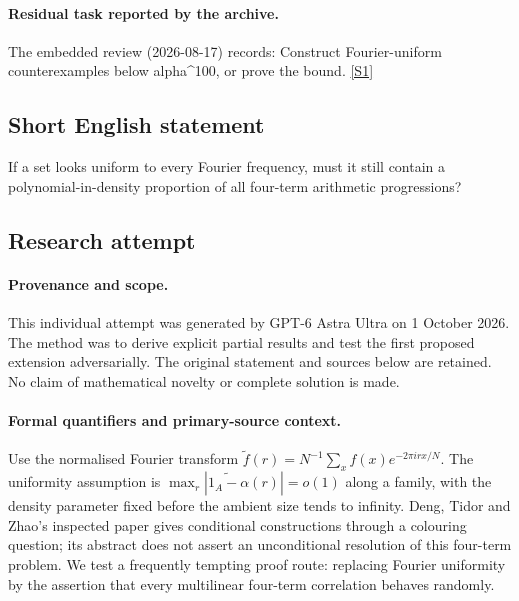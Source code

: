 \documentclass[11pt,a4paper]{article}
\newcommand{\sref}[2]{\hyperlink{source:#1:#2}{[S#2]}}
\begin{document}
\paragraph{Residual task reported by the archive.}

The embedded review (2026-08-17) records: Construct Fourier-uniform counterexamples below alpha\textasciicircum{}100, or prove the bound. \sref{statement}{1}

\subsection{Short English statement}

If a set looks uniform to every Fourier frequency, must it still contain a polynomial-in-density proportion of all four-term arithmetic progressions?

\subsection{Research attempt}

\paragraph{Provenance and scope.}
This individual attempt was generated by GPT-6 Astra Ultra on 1 October 2026. The method was to derive explicit partial results and test the first proposed extension adversarially. The original statement and sources below are retained. No claim of mathematical novelty or complete solution is made.

\paragraph{Formal quantifiers and primary-source context.}
Use the normalised Fourier transform $\widetilde f(r)=N^{-1}\sum_x f(x)e^{-2\pi irx/N}$. The uniformity assumption is $\max_r|\widetilde{1_A-\alpha}(r)|=o(1)$ along a family, with the density parameter fixed before the ambient size tends to infinity. Deng, Tidor and Zhao's inspected paper gives conditional constructions through a colouring question; its abstract does not assert an unconditional resolution of this four-term problem. We test a frequently tempting proof route: replacing Fourier uniformity by the assertion that every multilinear four-term correlation behaves randomly.
\end{document}
